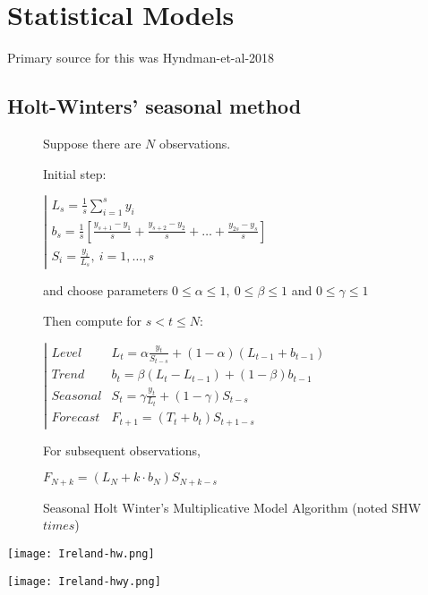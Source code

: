\section{Statistical Models}
\label{ch:statmodel}

Primary source for this was Hyndman-et-al-2018 %

\subsection{Holt-Winters’ seasonal method}

\begin{figure}
\begin{tcolorbox}[width=.5\textwidth]%

Suppose there are $N$ observations.

Initial step:

$\left|\begin{array}{l}
L_s = \frac1s \sum_{i=1}^s y_i \\
b_s = \frac1s \left[\frac{y_{s+1}-y_1}{s}+\frac{y_{s+2}-y_2}{s}+\dots+\frac{y_{2s}-y_s}{s}\right]\\
S_i  = \frac{y_i}{L_s}, \ i=1,\dots,s
\end{array}\right.$

and choose parameters $0\leq\alpha\leq1,\ 0\leq\beta\leq1$ and $0\leq\gamma\leq1$

Then compute for $s<t\leq N$:

$\left|\begin{array}{ll}
Level &       L_t = \alpha \frac{y_t}{S_{t-s}}+(1-\alpha)(L_{t-1}+b_{t-1})\\
Trend &      b_t = \beta(L_t-L_{t-1})+(1-\beta)b_{t-1}\\
Seasonal & S_t = \gamma \frac{y_t}{L_t} + (1-\gamma)S_{t-s}\\
Forecast & F_{t+1} = (T_t+b_t)S_{t+1-s}
\end{array}\right.$

For subsequent observations, 

$F_{N+k}=(L_N+k\cdot b_N) S_{N+k-s}$

\label{SHWx}
\end{tcolorbox}
\caption{Seasonal Holt Winter’s Multiplicative Model Algorithm (noted SHW$times$)}
\end{figure}

\texttt{[image: Ireland-hw.png]}

\texttt{[image: Ireland-hwy.png]}


